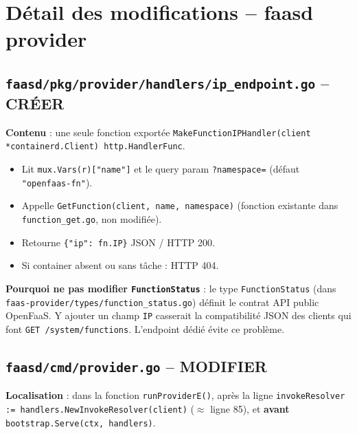 \documentclass[11pt,a4paper]{article}
\begin{document}
\section{Détail des modifications -- faasd provider}

\subsection{\texttt{faasd/pkg/provider/handlers/ip\_endpoint.go} -- CRÉER}

\textbf{Contenu} : une seule fonction exportée \texttt{MakeFunctionIPHandler(client *containerd.Client) http.HandlerFunc}.
\begin{itemize}
  \item Lit \texttt{mux.Vars(r)["name"]} et le query param \texttt{?namespace=}
    (défaut \texttt{"openfaas-fn"}).
  \item Appelle \texttt{GetFunction(client, name, namespace)} (fonction existante dans
    \texttt{function\_get.go}, non modifiée).
  \item Retourne \texttt{\{"ip": fn.IP\}} JSON / HTTP 200.
  \item Si container absent ou sans tâche : HTTP 404.
\end{itemize}

\textbf{Pourquoi ne pas modifier \texttt{FunctionStatus}} : le type \texttt{FunctionStatus}
(dans \texttt{faas-provider/types/function\_status.go}) définit le contrat API public OpenFaaS.
Y ajouter un champ \texttt{IP} casserait la compatibilité JSON des clients qui font
\texttt{GET /system/functions}. L'endpoint dédié évite ce problème.


\subsection{\texttt{faasd/cmd/provider.go} -- MODIFIER}

\textbf{Localisation} : dans la fonction \texttt{runProviderE()}, après la ligne
\texttt{invokeResolver := handlers.NewInvokeResolver(client)} ($\approx$ ligne 85), et
\textbf{avant} \texttt{bootstrap.Serve(ctx, handlers)}.
\end{document}
